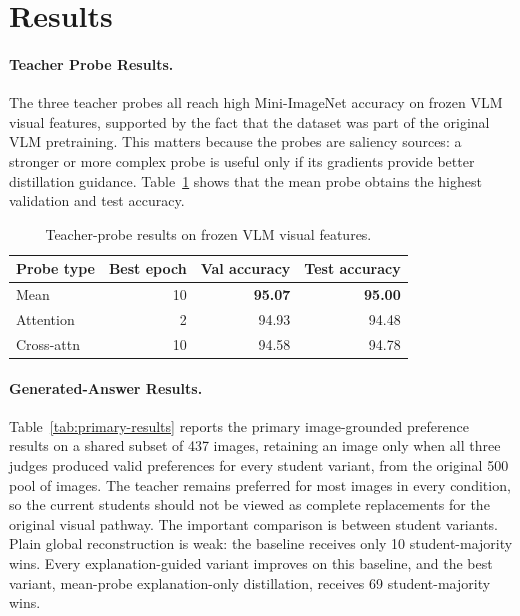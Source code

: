 \section{Results}
\label{sec:results}

\paragraph{Teacher Probe Results.}

The three teacher probes all reach high Mini-ImageNet accuracy on frozen VLM visual features, supported by the fact that the dataset was part of the original VLM pretraining.
This matters because the probes are saliency sources: a stronger or more complex probe is useful only if its gradients provide better distillation guidance.
Table~\ref{tab:probe-results} shows that the mean probe obtains the highest validation and test accuracy.

\begin{table}[H]
  \centering
  \caption{Teacher-probe results on frozen VLM visual features.}
  \label{tab:probe-results}
  \small
  \begin{tabular}{@{}lrrr@{}}
    \toprule
    Probe type & Best epoch & Val accuracy & Test accuracy  \\
    \midrule
    Mean & 10 & \textbf{95.07} & \textbf{95.00} \\
    Attention & 2 & 94.93 & 94.48 \\
    Cross-attn & 10 & 94.58 & 94.78 \\
    \bottomrule
  \end{tabular}
\end{table}


\paragraph{Generated-Answer Results.}

Table~\ref{tab:primary-results} reports the primary image-grounded preference results on a shared subset of 437 images, retaining an image only when all three judges produced valid preferences for every student variant, from the original 500 pool of images.
The teacher remains preferred for most images in every condition, so the current students should not be viewed as complete replacements for the original visual pathway.
The important comparison is between student variants.
Plain global reconstruction is weak: the baseline receives only 10 student-majority wins.
Every explanation-guided variant improves on this baseline, and the best variant, mean-probe explanation-only distillation, receives 69 student-majority wins.



